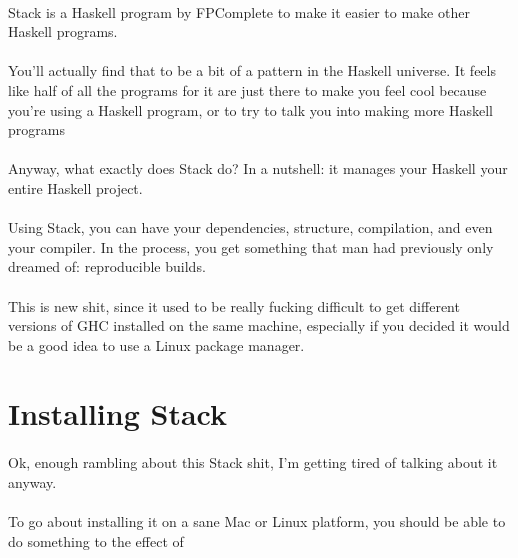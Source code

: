 \paragraph{}
Stack is a Haskell program by FPComplete to make it easier to make other Haskell programs.  

\paragraph{}
You'll actually find that to be a bit of a pattern in the Haskell universe.  It feels like half of all the programs for it are just there to make you feel cool because you're using a Haskell program, or to try to talk you into making more Haskell programs

\paragraph{}
Anyway, what exactly does Stack do?  In a nutshell: it manages your Haskell your entire Haskell project.  

\paragraph{}
Using Stack, you can have your dependencies, structure, compilation, and even your compiler.  In the process, you get something that man had previously only dreamed of: reproducible builds. 

\paragraph{}
This is new shit, since it used to be really fucking difficult to get different versions of GHC installed on the same machine, especially if you decided it would be a good idea to use a Linux package manager. 

\section {Installing Stack}

\paragraph{}
Ok, enough rambling about this Stack shit, I'm getting tired of talking about it anyway.  

\paragraph{}
To go about installing it on a sane Mac or Linux platform, you should be able to do something to the effect of 

